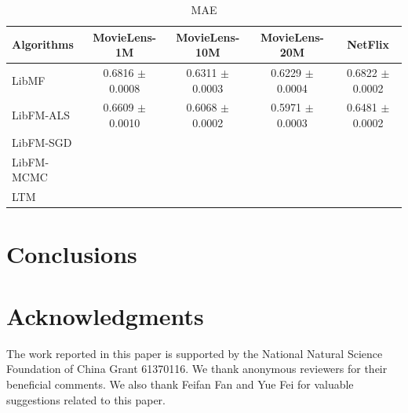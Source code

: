 \documentclass{sig-alternate-05-2015}
\begin{document}
\begin{table}[htpb]
	\centering
	\caption{MAE}
	\label{tab:msre}
	\begin{tabular}{|l|c|c|c|c|}
		\hline
		\textbf{Algorithms} & \textbf{MovieLens-1M} & \textbf{MovieLens-10M} & \textbf{MovieLens-20M}  & \textbf{NetFlix} \\
		\hline
		LibMF      & 0.6816 $\pm$ 0.0008 & 0.6311 $\pm$ 0.0003 & 0.6229 $\pm$ 0.0004 & 0.6822 $\pm$ 0.0002 \\
		LibFM-ALS  & 0.6609 $\pm$ 0.0010 & 0.6068 $\pm$ 0.0002 & 0.5971 $\pm$ 0.0003 & 0.6481 $\pm$ 0.0002 \\
		LibFM-SGD  &  &  &  & \\
		LibFM-MCMC &  &  &  & \\
		LTM        &  &  &  & \\
		\hline
	\end{tabular}
\end{table}


\section{Conclusions}


\section{Acknowledgments}
The work reported in this paper is supported by the National Natural Science Foundation of China Grant 61370116.
We thank anonymous reviewers for their beneficial comments.
We also thank Feifan Fan and Yue Fei for valuable suggestions related to this paper.



\end{document}
